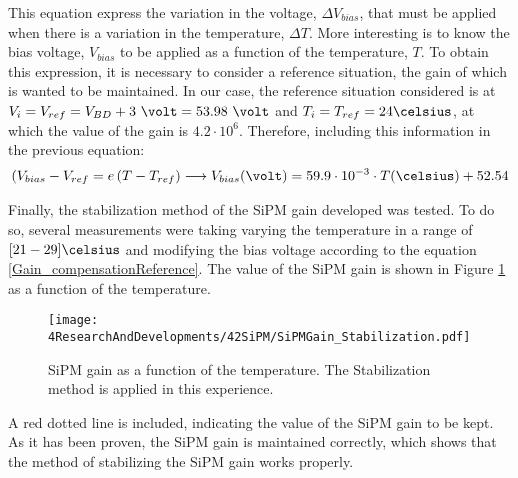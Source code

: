 This equation express the variation in the voltage, $\Delta V_{bias}$, that must be applied when there is a variation in the temperature, $\Delta T$. More interesting is to know the bias voltage, $V_{bias}$ to be applied as a function of the temperature, $T$. To obtain this expression, it is necessary to consider a reference situation, the gain of which is wanted to be maintained. In our case, the reference situation considered is at $V_i=V_{ref}= V_{BD}+3~\volt = 53.98~\volt$ and $T_i=T_{ref}=24\celsius$, at which the value of the gain is $4.2 \cdot{} 10^{6}$. Therefore, including this information in the previous equation:
\begin{equation*}
\begin{split}
(V_{bias}-V_{ref} = e \left( T -T_{ref} \right) \longrightarrow V_{bias}(\volt)= 59.9 \cdot{} 10^{-3} \cdot{} T(\celsius) + 52.54
\label{Gain_compensationReference}
\end{split}
\end{equation*} 

Finally, the stabilization method of the SiPM gain developed was tested. To do so, several measurements were taking varying the temperature in a range of $[21-29]\celsius$ and modifying the bias voltage according to the equation \ref{Gain_compensationReference}. The value of the SiPM gain is shown in Figure \ref{fig:SiPMGainStabilization} as a function of the temperature.

\begin{figure}[hbtp]
\centering
\texttt{[image: 4ResearchAndDevelopments/42SiPM/SiPMGain\_Stabilization.pdf]}
\caption{SiPM gain as a function of the temperature. The Stabilization method is applied in this experience. \label{fig:SiPMGainStabilization}}
\end{figure}

A red dotted line is included, indicating the value of the SiPM gain to be kept. As it has been proven, the SiPM gain is maintained correctly, which shows that the method of stabilizing the SiPM gain works properly.